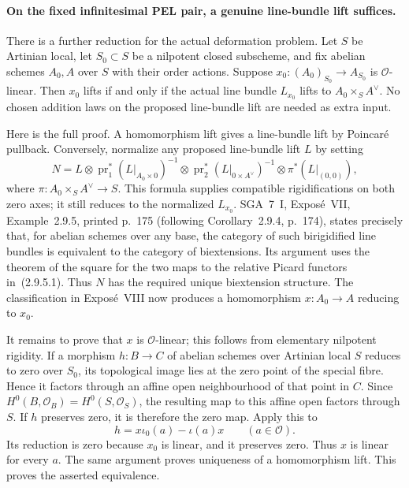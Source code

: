 \documentclass[11pt]{article}
\theoremstyle{definition}\newtheorem{definition}[theorem]{Definition}\newtheorem{remark}[theorem]{Remark}
\begin{document}
\paragraph{On the fixed infinitesimal PEL pair, a genuine line-bundle lift suffices.}
There is a further reduction for the actual deformation
problem.  Let $S$ be Artinian local, let $S_0\subset S$
be a nilpotent closed subscheme, and fix abelian schemes
$A_0,A$ over $S$ with their order actions.  Suppose
$x_0:(A_0)_{S_0}\to A_{S_0}$ is $\mathcal O$-linear.
Then $x_0$ lifts if and only if the actual line bundle
$L_{x_0}$ lifts to $A_0\times_S A^\vee$.
No chosen addition laws on the proposed line-bundle
lift are needed as extra input.

Here is the full proof.  A homomorphism lift gives a
line-bundle lift by Poincar\'e pullback.  Conversely,
normalize any proposed line-bundle lift $L$ by setting
\[
 N=L\otimes\operatorname{pr}_1^*(L|_{A_0\times0})^{-1}
       \otimes\operatorname{pr}_2^*(L|_{0\times A^\vee})^{-1}
       \otimes\pi^*(L|_{(0,0)}),
\]
where $\pi:A_0\times_S A^\vee\to S$.
This formula supplies compatible rigidifications on
both zero axes; it still reduces to the normalized
$L_{x_0}$.  SGA~7~I, Expos\'e~VII, Example~2.9.5,
printed p.~175 (following Corollary~2.9.4, p.~174),
states precisely that, for abelian schemes over any
base, the category of such birigidified line bundles
is equivalent to the category of biextensions.
Its argument uses the theorem of the square for the
two maps to the relative Picard functors in~(2.9.5.1).
Thus $N$ has the required unique biextension structure.
The classification in Expos\'e~VIII now produces a
homomorphism $x:A_0\to A$ reducing to $x_0$.

It remains to prove that $x$ is $\mathcal O$-linear;
this follows from elementary nilpotent rigidity.
If a morphism $h:B\to C$ of abelian schemes over
Artinian local $S$ reduces to zero over $S_0$,
its topological image lies at the zero point of the
special fibre.  Hence it factors through an affine
open neighbourhood of that point in $C$.
Since $H^0(B,\mathcal O_B)=H^0(S,\mathcal O_S)$,
the resulting map to this affine open factors through
$S$.  If $h$ preserves zero, it is therefore the zero
map.  Apply this to
\[
                h=x\iota_0(a)-\iota(a)x
                              \qquad(a\in\mathcal O).
\]
Its reduction is zero because $x_0$ is linear, and it
preserves zero.  Thus $x$ is linear for every $a$.
The same argument proves uniqueness of a homomorphism
lift.  This proves the asserted equivalence.
\end{document}
